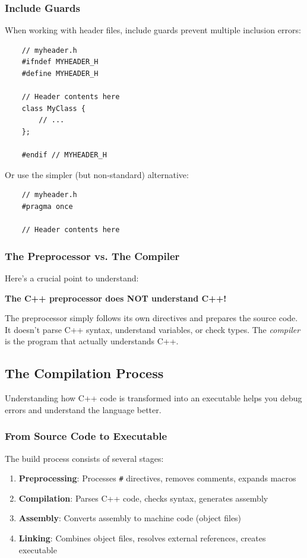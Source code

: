 \subsubsection{Include Guards}

When working with header files, include guards prevent multiple inclusion errors:

\begin{lstlisting}
	// myheader.h
	#ifndef MYHEADER_H
	#define MYHEADER_H
	
	// Header contents here
	class MyClass {
		// ...
	};
	
	#endif // MYHEADER_H
\end{lstlisting}

Or use the simpler (but non-standard) alternative:

\begin{lstlisting}
	// myheader.h
	#pragma once
	
	// Header contents here
\end{lstlisting}

\subsubsection{The Preprocessor vs. The Compiler}

Here's a crucial point to understand:

\begin{center}
	\textbf{The C++ preprocessor does NOT understand C++!}
\end{center}

The preprocessor simply follows its own directives and prepares the source code. It doesn't parse C++ syntax, understand variables, or check types. The \textit{compiler} is the program that actually understands C++.

\subsection{The Compilation Process}

Understanding how C++ code is transformed into an executable helps you debug errors and understand the language better.

\subsubsection{From Source Code to Executable}

The build process consists of several stages:

\begin{enumerate}
	\item \textbf{Preprocessing}: Processes \texttt{\#} directives, removes comments, expands macros
	\item \textbf{Compilation}: Parses C++ code, checks syntax, generates assembly
	\item \textbf{Assembly}: Converts assembly to machine code (object files)
	\item \textbf{Linking}: Combines object files, resolves external references, creates executable
\end{enumerate}


